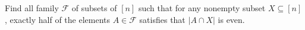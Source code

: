 Find all family $\mathcal{F}$ of subsets of $[n]$ such that for any nonempty subset $X\subseteq [n]$, exactly half of the elements $A\in \mathcal{F}$ satisfies that $|A\cap X|$ is even.